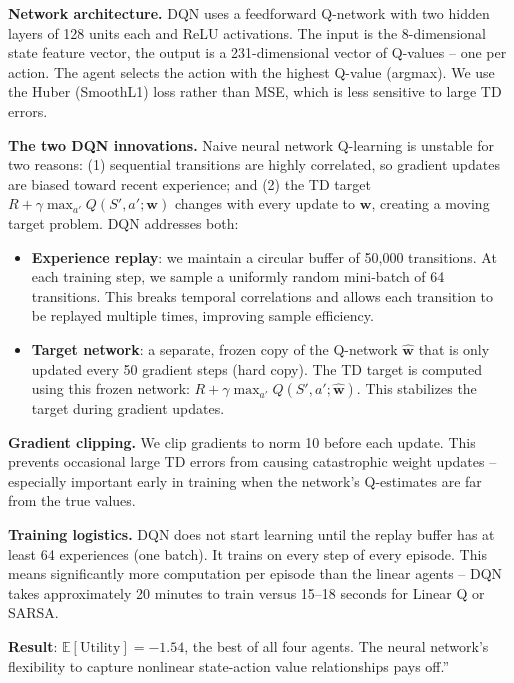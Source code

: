 \documentclass[11pt, letterpaper]{article}
\begin{document}
\textbf{Network architecture.} DQN uses a feedforward Q-network with two hidden layers of 128 units each and ReLU activations. The input is the 8-dimensional state feature vector, the output is a 231-dimensional vector of Q-values -- one per action. The agent selects the action with the highest Q-value (argmax). We use the Huber (SmoothL1) loss rather than MSE, which is less sensitive to large TD errors.

\textbf{The two DQN innovations.} Naive neural network Q-learning is unstable for two reasons: (1) sequential transitions are highly correlated, so gradient updates are biased toward recent experience; and (2) the TD target $R + \gamma \max_{a'} Q(S', a'; \mathbf{w})$ changes with every update to $\mathbf{w}$, creating a moving target problem. DQN addresses both:

\begin{itemize}
\item \textbf{Experience replay}: we maintain a circular buffer of 50,000 transitions. At each training step, we sample a uniformly random mini-batch of 64 transitions. This breaks temporal correlations and allows each transition to be replayed multiple times, improving sample efficiency.
\item \textbf{Target network}: a separate, frozen copy of the Q-network $\hat{\mathbf{w}}$ that is only updated every 50 gradient steps (hard copy). The TD target is computed using this frozen network: $R + \gamma \max_{a'} Q(S', a'; \hat{\mathbf{w}})$. This stabilizes the target during gradient updates.
\end{itemize}

\textbf{Gradient clipping.} We clip gradients to norm 10 before each update. This prevents occasional large TD errors from causing catastrophic weight updates -- especially important early in training when the network's Q-estimates are far from the true values.

\textbf{Training logistics.} DQN does not start learning until the replay buffer has at least 64 experiences (one batch). It trains on every step of every episode. This means significantly more computation per episode than the linear agents -- DQN takes approximately 20 minutes to train versus 15--18 seconds for Linear Q or SARSA.

\textbf{Result}: $\mathbb{E}[\text{Utility}] = -1.54$, the best of all four agents. The neural network's flexibility to capture nonlinear state-action value relationships pays off.''

\end{document}
